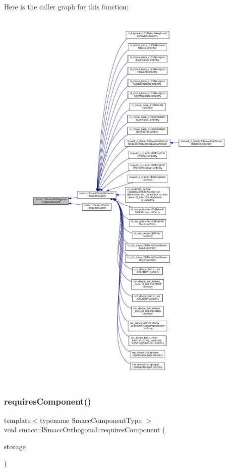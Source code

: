 Here is the caller graph for this function\+:
\nopagebreak
\begin{figure}[H]
\begin{center}
\leavevmode
\includegraphics[height=550pt]{classsmacc_1_1ISmaccOrthogonal_a602e16b09f8a1b3de889f2f3d90a3211_icgraph}
\end{center}
\end{figure}
\mbox{\label{classsmacc_1_1ISmaccOrthogonal_a3f66cf4680e3026a6789769c8ea1aa83}} 
\subsubsection{\texorpdfstring{requires\+Component()}{requiresComponent()}}
{\footnotesize\ttfamily template$<$typename Smacc\+Component\+Type $>$ \\
void smacc\+::\+I\+Smacc\+Orthogonal\+::requires\+Component (\begin{DoxyParamCaption}\item[{Smacc\+Component\+Type $\ast$\&}]{storage }\end{DoxyParamCaption})}



